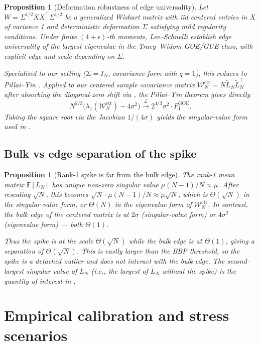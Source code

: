 \documentclass[11pt,a4paper]{article}
\newtheorem{proposition}[theorem]{Proposition}
\theoremstyle{definition}
\newcommand{\WN}{\mathcal{W}_N^{\mathrm{ctr}}}
\begin{document}
\begin{proposition}[Deformation robustness of edge universality]
\label{prop:lee-schnelli}
Let $W = \Sigma^{1/2}XX^\top\Sigma^{1/2}$ be a generalized Wishart matrix
with iid centered entries in $X$ of variance 1 and deterministic deformation
$\Sigma$ satisfying mild regularity conditions. Under finite $(4+\epsilon)$-th
moments, Lee--Schnelli \cite[Theorem~2.7]{LeeSchnelli2014} establish edge
universality of the largest eigenvalue in the Tracy--Widom GOE/GUE class,
with explicit edge and scale depending on $\Sigma$.

Specialized to our setting ($\Sigma = I_N$, covariance-form with $q = 1$),
this reduces to Pillai--Yin \cite{PillaiYin2014}. Applied to our centered
sample covariance matrix $\WN = N\tilde L_N\tilde L_N^\top$ after absorbing
the diagonal-zero shift via , the Pillai--Yin
theorem gives directly
\[
N^{2/3}\bigl(\lambda_1(\WN) - 4\sigma^2\bigr)\xrightarrow{\mathcal L}2^{4/3}\sigma^2\cdot F_1^{\mathrm{GOE}}.
\]
Taking the square root via the Jacobian $1/(4\sigma)$ yields the singular-value
form used in .
\end{proposition}

\subsection{Bulk vs edge separation of the spike}

\begin{proposition}[Rank-1 spike is far from the bulk edge]
\label{prop:spike-separation}
The rank-1 mean matrix $\mathbb E[L_N]$ has unique non-zero singular value
$\mu(N-1)/N\approx\mu$. After rescaling $\sqrt N$, this becomes
$\sqrt N\cdot\mu(N-1)/N\approx\mu\sqrt N$, which is $\Theta(\sqrt N)$ in
the singular-value form, or $\Theta(N)$ in the eigenvalue form of $\WN$.
In contrast, the bulk edge of the centered matrix is at $2\sigma$
(singular-value form) or $4\sigma^2$ (eigenvalue form) — both $\Theta(1)$.

Thus the spike is at the scale $\Theta(\sqrt N)$ while the bulk edge is at
$\Theta(1)$, giving a separation of $\Theta(\sqrt N)$. This is vastly larger
than the BBP threshold, so the spike is a \emph{detached outlier} and does
not interact with the bulk edge. The second-largest singular value of $L_N$
(i.e., the largest of $\tilde L_N$ without the spike) is the quantity of
interest in .
\end{proposition}

\section{Empirical calibration and stress scenarios}
\label{sec:empirical}
\end{document}
